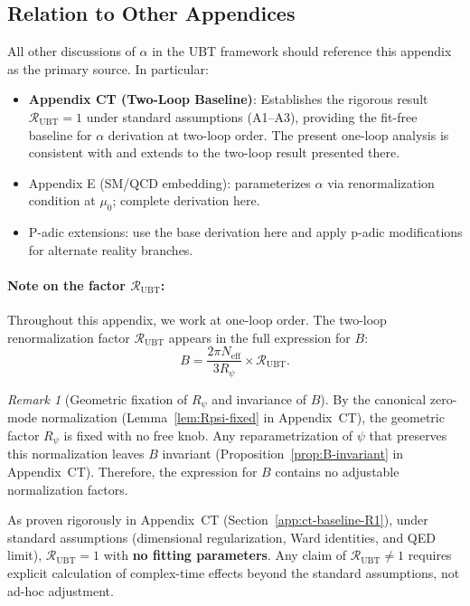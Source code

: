 \documentclass[11pt,a4paper]{article}
\theoremstyle{remark}
\newtheorem{remark}{Remark}
\begin{document}
\subsection{Relation to Other Appendices}

All other discussions of $\alpha$ in the UBT framework should reference this appendix as the primary source. In particular:
\begin{itemize}
\item \textbf{Appendix CT (Two-Loop Baseline)}: Establishes the rigorous result $\mathcal{R}_{\mathrm{UBT}} = 1$ under standard assumptions (A1--A3), providing the fit-free baseline for $\alpha$ derivation at two-loop order. The present one-loop analysis is consistent with and extends to the two-loop result presented there.
\item Appendix E (SM/QCD embedding): parameterizes $\alpha$ via renormalization condition at $\mu_0$; complete derivation here.
\item P-adic extensions: use the base derivation here and apply p-adic modifications for alternate reality branches.
\end{itemize}

\paragraph{Note on the factor $\mathcal{R}_{\mathrm{UBT}}$:}
Throughout this appendix, we work at one-loop order. The two-loop renormalization factor $\mathcal{R}_{\mathrm{UBT}}$ appears in the full expression for $B$:
\begin{equation}
B = \frac{2\pi N_{\mathrm{eff}}}{3R_\psi} \times \mathcal{R}_{\mathrm{UBT}}.
\label{eq:B-with-RUBT}
\end{equation}

\begin{remark}[Geometric fixation of $R_\psi$ and invariance of $B$]
By the canonical zero-mode normalization (Lemma~\ref{lem:Rpsi-fixed} in Appendix~CT), the geometric factor $R_\psi$ is fixed with no free knob. Any reparametrization of $\psi$ that preserves this normalization leaves $B$ invariant (Proposition~\ref{prop:B-invariant} in Appendix~CT). Therefore, the expression for $B$ contains no adjustable normalization factors.
\end{remark}

As proven rigorously in Appendix~CT (Section~\ref{app:ct-baseline-R1}), under standard assumptions (dimensional regularization, Ward identities, and QED limit), $\mathcal{R}_{\mathrm{UBT}} = 1$ with \textbf{no fitting parameters}. Any claim of $\mathcal{R}_{\mathrm{UBT}} \neq 1$ requires explicit calculation of complex-time effects beyond the standard assumptions, not ad-hoc adjustment.
\end{document}
